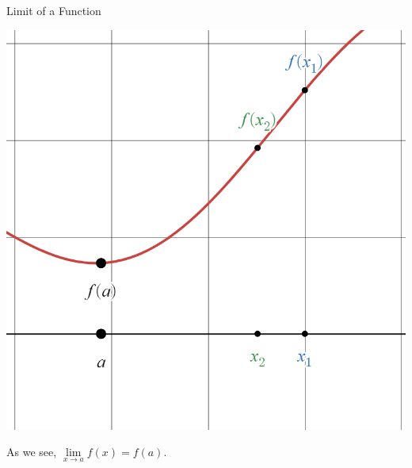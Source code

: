 \documentclass{beamer}
\begin{document}
\begin{frame}{Limit of a Function}

      \begin{center}

    \includegraphics[height=0.75\textheight, keepaspectratio]{cont2.png}
  \end{center}

{\color{white} As we see, $\lim\limits_{x\to a} f(x) = f(a)$.}

\end{frame}
\end{document}
